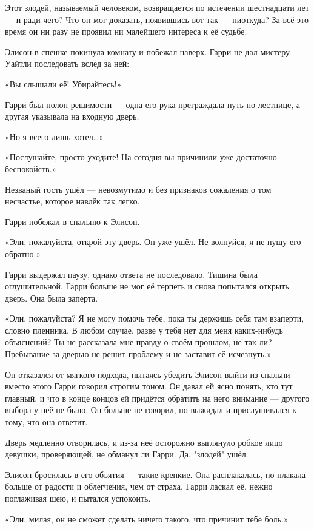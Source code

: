\documentclass[a4paper,12pt]{book}
\begin{document}
\par
Этот злодей, называемый человеком, возвращается по истечении шестнадцати лет — и ради чего? Что он мог доказать, появившись вот так — ниоткуда? За всё это время он ни разу не проявил ни малейшего интереса к её судьбе.
\par
Элисон в спешке покинула комнату и побежал наверх. Гарри не дал мистеру Уайтли последовать вслед за ней:
\par
«Вы слышали её! Убирайтесь!»
\par
Гарри был полон решимости — одна его рука преграждала путь по лестнице, а другая указывала на входную дверь.
\par
«Но я всего лишь хотел…»
\par
«Послушайте, просто уходите! На сегодня вы причинили уже достаточно беспокойств.»
\par
Незваный гость ушёл — невозмутимо и без признаков сожаления о том несчастье, которое навлёк так легко.
\par
Гарри побежал в спальню к Элисон.
\par
«Эли, пожалуйста, открой эту дверь. Он уже ушёл. Не волнуйся, я не пущу его обратно.»
\par
Гарри выдержал паузу, однако ответа не последовало. Тишина была оглушительной. Гарри больше не мог её терпеть и снова попытался открыть дверь. Она была заперта.
\par
«Эли, пожалуйста? Я не могу помочь тебе, пока ты держишь себя там взаперти, словно пленника. В любом случае, разве у тебя нет для меня каких-нибудь объяснений? Ты не рассказала мне правду о своём прошлом, не так ли? Пребывание за дверью не решит проблему и не заставит её исчезнуть.»
\par
Он отказался от мягкого подхода, пытаясь убедить Элисон выйти из спальни — вместо этого Гарри говорил строгим тоном. Он давал ей ясно понять, кто тут главный, и что в конце концов ей придётся обратить на него внимание — другого выбора у неё не было. Он больше не говорил, но выжидал и прислушивался к тому, что она ответит.
\par
Дверь медленно отворилась, и из-за неё осторожно выглянуло робкое лицо девушки, проверяющей, не обманул ли Гарри. Да, "злодей" ушёл.
\par
Элисон бросилась в его объятия — такие крепкие. Она расплакалась, но плакала больше от радости и облегчения, чем от страха. Гарри ласкал её, нежно поглаживая шею, и пытался успокоить.
\par
«Эли, милая, он не сможет сделать ничего такого, что причинит тебе боль.»
\end{document}
